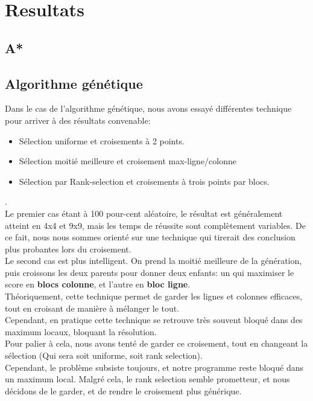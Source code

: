 \chapter{Resultats}
    \section{A*}
    \section{Algorithme génétique}
        Dans le cas de l'algorithme génétique, nous avons essayé différentes technique pour arriver à des résultats convenable:
        \begin{itemize}
            \item Sélection uniforme et croisements à 2 points.
            \item Sélection moitié meilleure et croisement max-ligne/colonne
            \item Sélection par Rank-selection et croisements à trois points par blocs.
        \end{itemize}.\\

        Le premier cas étant à 100 pour-cent aléatoire, le résultat est généralement atteint en 4x4 et 9x9, mais les temps de réussite sont complètement variables. De ce fait, nous nous sommes orienté sur une technique qui tirerait des conclusion plus probantes lors du croisement.\\

        Le second cas est plus intelligent. On prend la moitié meilleure de la génération, puis croissons les deux parents pour donner deux enfants: un qui maximiser le score en \textbf{blocs colonne}, et l'autre en \textbf{bloc ligne}.\\
        Théoriquement, cette technique permet de garder les lignes et colonnes efficaces, tout en croisant de manière à mélanger le tout.\\
        Cependant, en pratique cette technique se retrouve très souvent bloqué dans des maximum locaux, bloquant la résolution.\\
        Pour palier à cela, nous avons tenté de garder ce croisement, tout en changeant la sélection (Qui sera soit uniforme, soit rank selection).\\
        Cependant, le problème subsiste toujours, et notre programme reste bloqué dans un maximum local. Malgré cela, le rank selection semble prometteur, et nous décidons de le garder, et de rendre le croisement plus générique.\\

